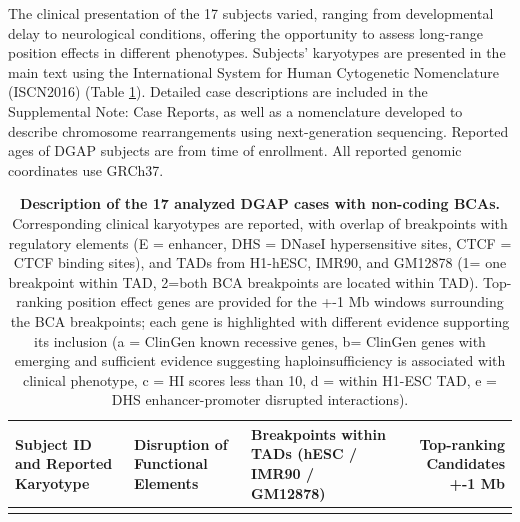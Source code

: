 \documentclass[a4paper,twoside=true,openright,parskip=full,chapterprefix=true,11pt,headings=normal,bibliography=totoc,listof=totoc,titlepage=on,captions=tableabove,draft=false]{scrreprt}
\theoremstyle{definition}
\theoremstyle{definition}
\theoremstyle{definition}
\theoremstyle{remark}
\begin{document}
The clinical presentation of the 17 subjects varied, ranging from
developmental delay to neurological conditions, offering the opportunity
to assess long-range position effects in different phenotypes. Subjects'
karyotypes are presented in the main text using the International System
for Human Cytogenetic Nomenclature (ISCN2016) (Table
\ref{tab:position-effect-subjects}). Detailed case descriptions are
included in the Supplemental Note: Case Reports, as well as a
nomenclature developed to describe chromosome rearrangements using
next-generation sequencing.\citep{Ordulu2014} Reported ages of DGAP
subjects are from time of enrollment. All reported genomic coordinates
use GRCh37.

\begin{longtable}[]{@{}lllr@{}}
\caption{\label{tab:position-effect-subjects} \textbf{Description of the 17
analyzed DGAP cases with non-coding BCAs.} Corresponding clinical
karyotypes are reported, with overlap of breakpoints with regulatory
elements (E = enhancer, DHS = DNaseI hypersensitive sites, CTCF = CTCF
binding sites), and TADs from H1-hESC, IMR90, and GM12878 (1= one
breakpoint within TAD, 2=both BCA breakpoints are located within TAD).
Top-ranking position effect genes are provided for the +-1 Mb windows
surrounding the BCA breakpoints; each gene is highlighted with different
evidence supporting its inclusion (a = ClinGen known recessive genes, b=
ClinGen genes with emerging and sufficient evidence suggesting
haploinsufficiency is associated with clinical phenotype, c = HI scores
less than 10, d = within H1-ESC TAD, e = DHS enhancer-promoter disrupted
interactions).}\tabularnewline
\toprule
\begin{minipage}[b]{0.25\columnwidth}\raggedright
\textbf{Subject ID and Reported Karyotype}\strut
\end{minipage} & \begin{minipage}[b]{0.19\columnwidth}\raggedright
\textbf{Disruption of Functional Elements}\strut
\end{minipage} & \begin{minipage}[b]{0.26\columnwidth}\raggedright
\textbf{Breakpoints within TADs (hESC / IMR90 / GM12878)}\strut
\end{minipage} & \begin{minipage}[b]{0.18\columnwidth}\raggedleft
\textbf{Top-ranking Candidates +-1 Mb }\strut
\end{minipage}\tabularnewline
\midrule
\endfirsthead
\toprule
\begin{minipage}[b]{0.25\columnwidth}\raggedright

\end{minipage}
\end{longtable}
\end{document}
